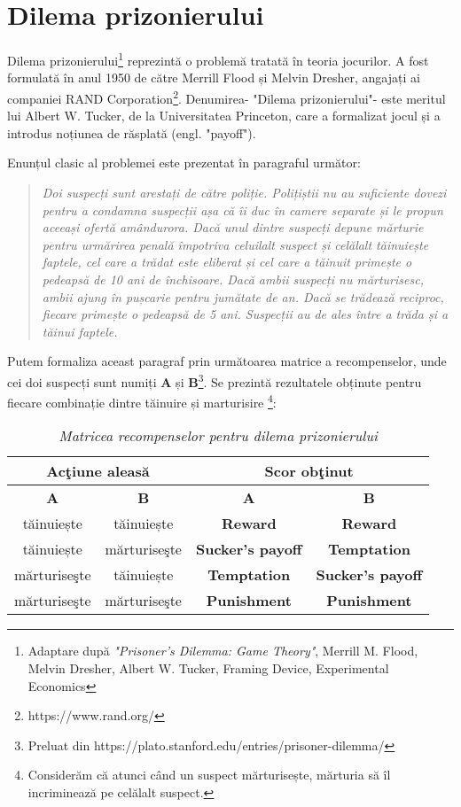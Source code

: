 \section{Dilema prizonierului}

Dilema prizonierului\footnote{Adaptare după \textit{"Prisoner's Dilemma: Game Theory"}, Merrill M. Flood, Melvin Dresher, Albert W. Tucker, Framing Device, Experimental Economics} reprezintă o problemă tratată în teoria jocurilor. A fost formulată în anul 1950 de către Merrill Flood și Melvin Dresher, angajați ai companiei RAND Corporation\footnote{https://www.rand.org/}. Denumirea- "Dilema prizonierului"- este meritul lui Albert W. Tucker, de la Universitatea Princeton, care a formalizat jocul și a introdus noțiunea de răsplată (engl. "payoff").
 
Enunțul clasic al problemei este prezentat în paragraful următor: 

\begin{quote} 
	\textit{Doi suspecți sunt arestați de către poliție. Polițiștii nu au suficiente dovezi pentru a condamna suspecții așa că îi duc în camere separate și le propun aceeași ofertă amândurora. Dacă unul dintre suspecți depune mărturie pentru urmărirea penală împotriva celuilalt suspect și celălalt tăinuiește faptele, cel care a trădat este eliberat și cel care a tăinuit primește o pedeapsă de 10 ani de închisoare. Dacă ambii suspecți nu mărturisesc, ambii ajung în pușcarie pentru jumătate de an. Dacă se trădează reciproc, fiecare primește o pedeapsă de 5 ani. Suspecții au de ales între a trăda și a tăinui faptele.}
\end{quote}

Putem formaliza aceast paragraf prin următoarea matrice a recompenselor, unde cei doi suspecți sunt numiți \textbf{A} și \textbf{B}\footnote{Preluat din https://plato.stanford.edu/entries/prisoner-dilemma/}. Se prezintă rezultatele obținute pentru fiecare combinație dintre tăinuire și marturisire \footnote{Considerăm că atunci când un suspect mărturisește, mărturia să îl incriminează pe celălalt suspect.}:  

\begin{table}[H]
	\centering
	\def\arraystretch{1.75}
	\begin{tabular}{|c|c|c|c|}
		\hline
		\multicolumn{2}{|c|}{\textbf{Acţiune aleasă}} & \multicolumn{2}{c|}{\textbf{Scor obţinut}} \\ \hline
		\textbf{A} & \textbf{B} & \textbf{A} & \textbf{B} \\ \hline
		tăinuiește & tăinuiește & \textbf{Reward} & \textbf{Reward} \\ \hline
		tăinuiește & mărturiseşte & \textbf{Sucker's payoff} & \textbf{Temptation} \\ \hline
		mărturiseşte & tăinuiește & \textbf{Temptation} & \textbf{Sucker's payoff} \\ \hline
		mărturiseşte & mărturiseşte & \textbf{Punishment} & \textbf{Punishment} \\ \hline
	\end{tabular}
	\caption{\textit{Matricea recompenselor pentru dilema prizonierului}}
	\label{matricea_recompenselor}
\end{table}

